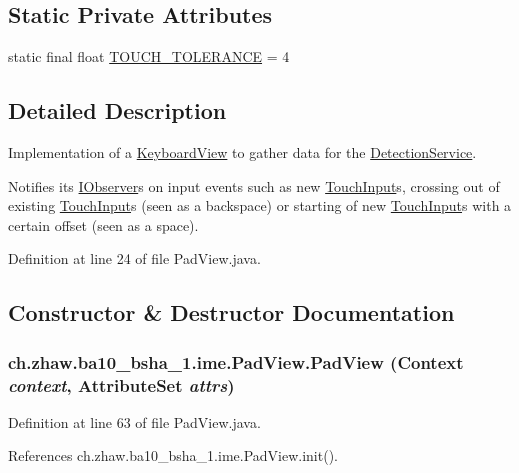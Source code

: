 \subsection*{Static Private Attributes}
\begin{DoxyCompactItemize}
\item 
static final float \hyperlink{classch_1_1zhaw_1_1ba10__bsha__1_1_1ime_1_1PadView_a5fa1919707284dc6019fbc707998b7fe}{TOUCH\_\-TOLERANCE} = 4
\end{DoxyCompactItemize}


\subsection{Detailed Description}
Implementation of a \hyperlink{}{KeyboardView} to gather data for the \hyperlink{}{DetectionService}.

Notifies its \hyperlink{interfacech_1_1zhaw_1_1ba10__bsha__1_1_1ime_1_1IObserver}{IObserver}s on input events such as new \hyperlink{classch_1_1zhaw_1_1ba10__bsha__1_1_1ime_1_1TouchInput}{TouchInput}s, crossing out of existing \hyperlink{classch_1_1zhaw_1_1ba10__bsha__1_1_1ime_1_1TouchInput}{TouchInput}s (seen as a backspace) or starting of new \hyperlink{classch_1_1zhaw_1_1ba10__bsha__1_1_1ime_1_1TouchInput}{TouchInput}s with a certain offset (seen as a space). 

Definition at line 24 of file PadView.java.

\subsection{Constructor \& Destructor Documentation}
\hypertarget{classch_1_1zhaw_1_1ba10__bsha__1_1_1ime_1_1PadView_a08835b6a562f4b6dcab131be32589200}{
\subsubsection[{PadView}]{\setlength{\rightskip}{0pt plus 5cm}ch.zhaw.ba10\_\-bsha\_\-1.ime.PadView.PadView (Context {\em context}, \/  AttributeSet {\em attrs})}}
\label{classch_1_1zhaw_1_1ba10__bsha__1_1_1ime_1_1PadView_a08835b6a562f4b6dcab131be32589200}


Definition at line 63 of file PadView.java.

References ch.zhaw.ba10\_\-bsha\_\-1.ime.PadView.init().

